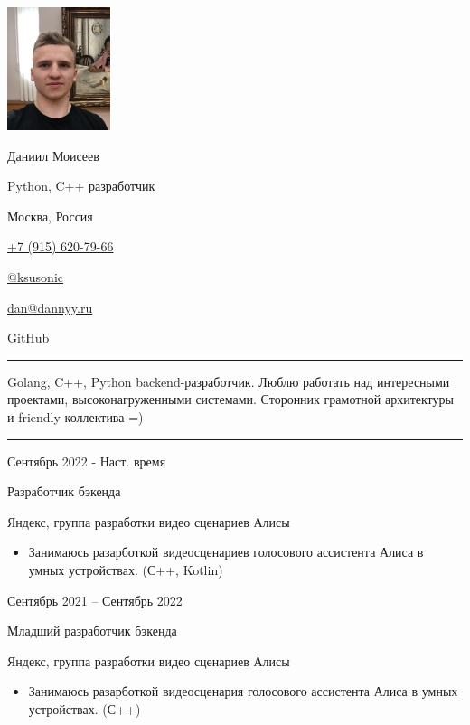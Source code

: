 \documentclass[a4paper,10pt]{article}
\newlength{\cvcolumngapwidth}
\newlength{\cvleftcolumnwidth}
\newlength{\cvrightcolumnwidth}
\newcommand{\cvnamestyle}[1]{{\Large\cvnamefont\textcolor{cvnamecolor}{#1}}}
\newcommand{\cvsectionstyle}[1]{{\normalsize\cvsectionfont\textcolor{cvsectioncolor}{#1}}}
\newcommand{\cvtitlestyle}[1]{{\large\cvtitlefont\textcolor{cvtitlecolor}{#1}}}
\newcommand{\cvdurationstyle}[1]{{\small\cvdurationfont\textcolor{cvdurationcolor}{#1}}}
\newlength{\cvafteritemskipamount}
\newlength{\cvaftersectionskipamount}
\newlength{\cvafternameskipamount}
\newlength{\cvafterpersonalinfolineskipamount}
\newlength{\cvaftertitleskipamount}
\newlength{\cvparskip}
\newcommand{\cvpersonalinfo}[2]{
    \begin{minipage}[t]{\cvleftcolumnwidth}
        \vspace{0mm} %
        \raggedleft #1
    \end{minipage}%
    \hspace{\cvcolumngapwidth}%
    \begin{minipage}[t]{\cvrightcolumnwidth}
        \vspace{0mm} %
        #2
    \end{minipage}

    \vspace{\cvafteritemskipamount}
}
\newcommand{\cvname}[1]{
    \cvnamestyle{#1}

    \vspace{\cvafternameskipamount}
}
\newcommand{\cvpersonalinfolinewithicon}[3]{
    \raisebox{.5\fontcharht\font`E-.5\height}{\texttt{[image: \#2]}}
    #3

    \vspace{\cvafterpersonalinfolineskipamount}
}
\newcommand{\cvsection}[1]{
    \begin{minipage}[t]{\cvleftcolumnwidth}
        \raggedleft\cvsectionstyle{#1}
    \end{minipage}%
    \hspace{\cvcolumngapwidth}%
    \begin{minipage}[t]{\cvrightcolumnwidth}
        \textcolor{cvrulecolor}{\rule{\cvrightcolumnwidth}{0.3mm}}
    \end{minipage}

    \vspace{\cvaftersectionskipamount}
}
\newcommand{\cvitem}[2]{
    \begin{minipage}[t]{\cvleftcolumnwidth}
        \raggedleft #1
    \end{minipage}%
    \hspace{\cvcolumngapwidth}%
    \begin{minipage}[t]{\cvrightcolumnwidth}
        \setlength{\parskip}{\cvparskip} #2
    \end{minipage}

    \vspace{\cvafteritemskipamount}
}
\newcommand{\cvtitle}[1]{
    \cvtitlestyle{#1}

    \vspace{\cvaftertitleskipamount}
    \vspace{-\cvparskip}
}
\begin{document}

\cvpersonalinfo{
    \includegraphics[height=36mm]{img/dan.jpg}
}{
    \cvname{Даниил Моисеев}
    \cvdurationstyle {Python, C++ разработчик}

    \cvpersonalinfolinewithicon{height=4mm}{img/072-location.pdf}{Москва, Россия}

    \cvpersonalinfolinewithicon{height=4mm}{img/067-phone.pdf}{
        \href{tel:+79156207966}{+7 (915) 620-79-66}
    }

    \cvpersonalinfolinewithicon{height=4mm}{img/telegram.png}{
        \href{https://t.me/ksusonic}{@ksusonic}
    }

    \cvpersonalinfolinewithicon{height=4mm}{img/070-envelop.pdf}{
        \href{mailto:dan@dannyy.ru}{dan@dannyy.ru}
    }

    \cvpersonalinfolinewithicon{height=4mm}{img/github-square-512.png}{
        \href{https://github.com/ksusonic}{GitHub}
    }
}


\cvsection{О себе}
\cvitem{
    \cvdurationstyle{}
}{
    Golang, C++, Python backend-разработчик. Люблю работать над интересными проектами, высоконагруженными системами.
    Сторонник грамотной архитектуры и friendly-коллектива =)
}


\cvsection{Опыт работы}

\cvitem{
    \cvdurationstyle{Сентябрь 2022 - Наст. время}
}{
    \cvtitle{Разработчик бэкенда}

    Яндекс, группа разработки видео сценариев Алисы

    \begin{itemize}[leftmargin=*]
        \item Занимаюсь разарботкой видеосценариев голосового ассистента Алиса в умных устройствах. (С++, Kotlin)
    \end{itemize}
}

\cvitem{
    \cvdurationstyle{Сентябрь 2021 -- Сентябрь 2022}
}{
    \cvtitle{Младший разработчик бэкенда}

    Яндекс, группа разработки видео сценариев Алисы

    \begin{itemize}[leftmargin=*]
        \item Занимаюсь разарботкой видеосценария голосового ассистента Алиса в умных устройствах. (С++)
    \end{itemize}
}
\end{document}
